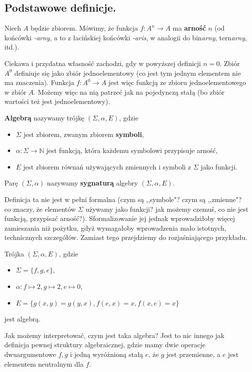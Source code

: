 \subsection{Podstawowe definicje.}

\begin{definition}
	Niech $A$ będzie zbiorem.
	Mówimy, że funkcja $f: A^n \to A$ ma \textbf{arność} $n$ (od końcówki \textit{-arny},
	a to z łacińskiej końcówki \textit{-aris},
	w analogii do bin\textit{arny}, tern\textit{arny}, itd.).
\end{definition}

Ciekawa i przydatna własność zachodzi, gdy w powyższej definicji $n = 0$.
Zbiór $A^0$ definiuje się jako zbiór jednoelementowy (co jest tym jednym elementem nie ma znaczenia).
Funkcja $f:A^0 \to A$ jest więc funkcją ze zbioru jednoelementowego w zbiór $A$.
Możemy więc na nią patrzeć jak na pojedynczą stałą (bo zbiór wartości też jest jednoelementowy).

\begin{definition}
	\textbf{Algebrą} nazywamy trójkę $(\Sigma, \alpha, E)$,
	gdzie
	\begin{itemize}
		\item $\Sigma$ jest zbiorem, zwanym zbiorem \textbf{symboli},
		\item $\alpha: \Sigma \to \mathbb{N}$ jest funkcją, która każdemu symbolowi przypisuje arność,
		\item $E$ jest zbiorem równań używających zmiennych i symboli z $\Sigma$ jako funkcji.
	\end{itemize}
	Parę $(\Sigma, \alpha)$ nazywamy \textbf{sygnaturą} algebry $(\Sigma, \alpha, E)$.
\end{definition}

Definicja ta nie jest w pełni formalna (czym są ,,symbole"? czym są ,,zmienne"?
	co znaczy, że elementów $\Sigma$ używamy jako funkcji?
	jak możemy czemuś, co nie jest funkcją, przypisać arność?).
Sformalizowanie jej jednak wprowadziłoby więcej zamieszania niż pożytku,
	gdyż wymagałoby wprowadzenia mało istotnych, technicznych szczegółów.
Zamiast tego przejdziemy do rozjaśniającego przykładu.

\begin{example}
	Trójka $(\Sigma, \alpha, E)$, gdzie
	\begin{itemize}
		\item $\Sigma = \{f, g, e\}$,
		\item $\alpha: f \mapsto 2, g \mapsto 2, e \mapsto 0$,
		\item $E = \{g(x, y) = g(y, x), f(e, x) = x, f(x, e) = x\}$
	\end{itemize}
	jest algebrą.
\end{example}
Jak możemy interpretować, czym jest taka algebra?
Jest to nic innego jak definicja pewnej struktury algebraicznej,
gdzie mamy dwie operacje dwuargumentowe $f, g$ i jedną wyróżnioną stałą $e$,
że $g$ jest przemienne, a $e$ jest elementem neutralnym dla $f$.


